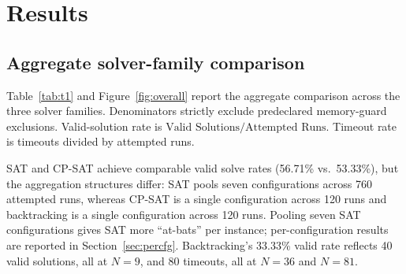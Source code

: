 \documentclass[a4paper,fleqn]{cas-sc}
\begin{document}
\section{Results}\label{sec:results}

\subsection{Aggregate solver-family comparison}\label{sec:aggregate}

Table~\ref{tab:t1} and Figure~\ref{fig:overall} report the aggregate comparison across the three solver families. Denominators strictly exclude predeclared memory-guard exclusions. Valid-solution rate is \(\text{Valid Solutions}/\text{Attempted Runs}\). Timeout rate is timeouts divided by attempted runs.

\begin{table}[htbp]
\centering
\caption{Aggregate solver-family comparison. Denominators exclude 80 predeclared SAT memory-guard exclusions. Valid rate and timeout rate are computed over attempted runs. Median solve time is over successful runs only.}
\label{tab:t1}
\small
{}
\end{table}

SAT and CP-SAT achieve comparable valid solve rates (56.71\% vs.\ 53.33\%), but the aggregation structures differ: SAT pools seven configurations across 760 attempted runs, whereas CP-SAT is a single configuration across 120 runs and backtracking is a single configuration across 120 runs. Pooling seven SAT configurations gives SAT more ``at-bats'' per instance; per-configuration results are reported in Section~\ref{sec:percfg}. Backtracking's 33.33\% valid rate reflects 40 valid solutions, all at \(N=9\), and 80 timeouts, all at \(N=36\) and \(N=81\).
\end{document}
